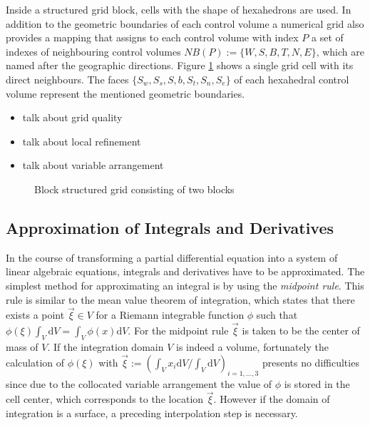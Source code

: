 Inside a structured grid block, cells with the shape of hexahedrons are used. In addition to the geometric boundaries of each control volume a numerical grid also provides a mapping that assigns to each control volume with index \(P\) a set of indexes of neighbouring control volumes \(NB(P):=\{W,S,B,T,N,E\}\), which are named after the geographic directions. Figure \ref{fig:blockstruc} shows a single grid cell with its direct neighbours. The faces \(\{S_w,S_s,S,b,S_t,S_n,S_e\}\) of each hexahedral control volume represent the mentioned geometric boundaries. 

    \begin{itemize}
      \item talk about grid quality
      \item talk about local refinement
      \item talk about variable arrangement
    \end{itemize}

    \begin{figure}[h]
      \label{fig:blockstruc}
      \qquad
      \caption{Block structured grid consisting of two blocks}
     \end{figure}
    
    \subsection{Approximation of Integrals and Derivatives}
    \label{sec:approxintegralderivative}

    In the course of transforming a partial differential equation into a system of linear algebraic equations, integrals and derivatives have to be approximated. The simplest method for approximating an integral is by using the \emph{midpoint rule}. This rule is similar to the mean value theorem of integration, which states that there exists a point \(\vec{\xi} \in V\) for a Riemann integrable function \(\phi\) such that \(\textstyle \phi(\xi) \int_V \mathrm{d}V = \int_V \phi(x) \mathrm{d}V\). For the midpoint rule \(\vec{\xi}\) is taken to be the center of mass of \(V\). If the integration domain \(V\) is indeed a volume, fortunately the calculation of \(\phi(\mathbb{\xi})\) with \(\textstyle \vec{\xi} := \left({ \int_V x_i \mathrm{d}V }/{ \int_V \mathrm{d}V } \right)_{i = 1,\dots,3}\) presents no difficulties since due to the collocated variable arrangement the value of \(\phi\) is stored in the cell center, which corresponds to the location \(\vec{\xi}\). However if the domain of integration is a surface, a preceding interpolation step is necessary.

